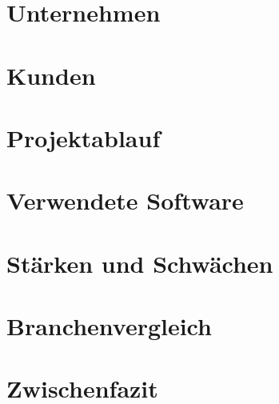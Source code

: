 \section{Unternehmen}


\section{Kunden}


\section{Projektablauf}\label{chap:projektablauf}


\section{Verwendete Software}


\section{Stärken und Schwächen}


\section{Branchenvergleich}


\section{Zwischenfazit}


% 
